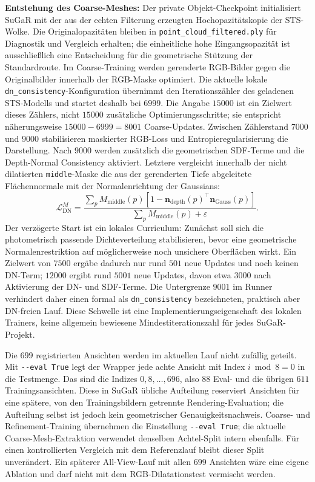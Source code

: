 \documentclass[12pt,a4paper]{article}
\begin{document}
\textbf{Entstehung des Coarse-Meshes:} Der private Objekt-Checkpoint initialisiert SuGaR mit der aus der echten Filterung erzeugten Hochopazitätskopie der STS-Wolke. Die Originalopazitäten bleiben in \texttt{point\_cloud\_filtered.ply} für Diagnostik und Vergleich erhalten; die einheitliche hohe Eingangsopazität ist ausschließlich eine Entscheidung für die geometrische Stützung der Standardroute. Im Coarse-Training werden gerenderte RGB-Bilder gegen die Originalbilder innerhalb der RGB-Maske optimiert. Die aktuelle lokale \texttt{dn\_consistency}-Konfiguration übernimmt den Iterationszähler des geladenen STS-Modells und startet deshalb bei $6999$. Die Angabe $15000$ ist ein Zielwert dieses Zählers, nicht $15000$ zusätzliche Optimierungsschritte; sie entspricht näherungsweise $15000-6999=8001$ Coarse-Updates. Zwischen Zählerstand $7000$ und $9000$ stabilisieren maskierter RGB-Loss und Entropieregularisierung die Darstellung. Nach $9000$ werden zusätzlich die geometrischen SDF-Terme und die Depth-Normal Consistency aktiviert. Letztere vergleicht innerhalb der nicht dilatierten \texttt{middle}-Maske die aus der gerenderten Tiefe abgeleitete Flächennormale mit der Normalenrichtung der Gaussians:
\[
\mathcal{L}_{\mathrm{DN}}^{M} =
\frac{\sum_{p} M_{\mathrm{middle}}(p)
\left[1-\mathbf{n}_{\mathrm{depth}}(p)^{\top}\mathbf{n}_{\mathrm{Gauss}}(p)\right]}
{\sum_{p} M_{\mathrm{middle}}(p)+\varepsilon}.
\]
Der verzögerte Start ist ein lokales Curriculum: Zunächst soll sich die photometrisch passende Dichteverteilung stabilisieren, bevor eine geometrische Normalenrestriktion auf möglicherweise noch unsichere Oberflächen wirkt. Ein Zielwert von $7500$ ergäbe dadurch nur rund $501$ neue Updates und noch keinen DN-Term; $12000$ ergibt rund $5001$ neue Updates, davon etwa $3000$ nach Aktivierung der DN- und SDF-Terme. Die Untergrenze $9001$ im Runner verhindert daher einen formal als \texttt{dn\_consistency} bezeichneten, praktisch aber DN-freien Lauf. Diese Schwelle ist eine Implementierungseigenschaft des lokalen Trainers, keine allgemein bewiesene Mindestiterationszahl für jedes SuGaR-Projekt.

Die $699$ registrierten Ansichten werden im aktuellen Lauf nicht zufällig geteilt. Mit \texttt{-{}-eval True} legt der Wrapper jede achte Ansicht mit Index $i \bmod 8 = 0$ in die Testmenge. Das sind die Indizes $0,8,\ldots,696$, also $88$ Eval- und die übrigen $611$ Trainingsansichten. Diese in SuGaR übliche Aufteilung reserviert Ansichten für eine spätere, von den Trainingsbildern getrennte Rendering-Evaluation; die Aufteilung selbst ist jedoch kein geometrischer Genauigkeitsnachweis. Coarse- und Refinement-Training übernehmen die Einstellung \texttt{-{}-eval True}; die aktuelle Coarse-Mesh-Extraktion verwendet denselben Achtel-Split intern ebenfalls. Für einen kontrollierten Vergleich mit dem Referenzlauf bleibt dieser Split unverändert. Ein späterer All-View-Lauf mit allen $699$ Ansichten wäre eine eigene Ablation und darf nicht mit dem RGB-Dilatationstest vermischt werden.
\end{document}

